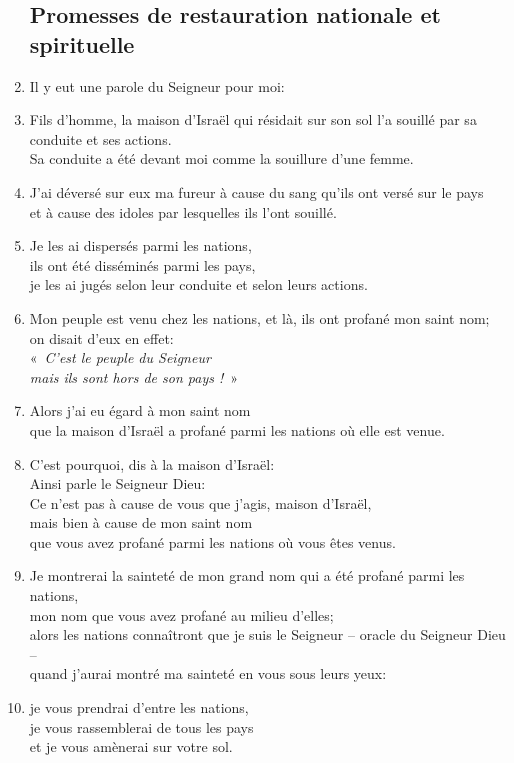 \documentclass[12pt,a4paper,titlepage]{article}
\def \pslabelsep{0.2em} %
\def \psleftmargin{0em} %
\begin{document}
\begin{enumerate}[leftmargin=\psleftmargin, labelsep = \pslabelsep, label={\arabic*}, font=\color{\pscolor}\small\textsuperscript, parsep=0em, itemsep=0em, topsep=0em ]
\subsection*{Promesses de restauration nationale et spirituelle}
\item Il y eut une parole du Seigneur pour moi:
\item Fils d’homme, la maison d’Israël qui résidait sur son sol l’a souillé par sa conduite et ses actions. \\ Sa conduite a été devant moi comme la souillure d’une femme.
\item J’ai déversé sur eux ma fureur à cause du sang qu’ils ont versé sur le pays \\ et à cause des idoles par lesquelles ils l’ont souillé.
\item Je les ai dispersés parmi les nations, \\ ils ont été disséminés parmi les pays, \\ je les ai jugés selon leur conduite et selon leurs actions.
\item Mon peuple est venu chez les nations, et là, ils ont profané mon saint nom; \\ on disait d’eux en effet: \\ \decalage «~\textit{C’est le peuple du Seigneur \\ \decalage mais ils sont hors de son pays !}~»
\item Alors j’ai eu égard à mon saint nom \\ que la maison d’Israël a profané parmi les nations où elle est venue. \parSpace
\item C’est pourquoi, dis à la maison d’Israël: \\ Ainsi parle le Seigneur Dieu: \\ Ce n’est pas à cause de vous que j’agis, maison d’Israël, \\ mais bien à cause de mon saint nom \\ que vous avez profané parmi les nations où vous êtes venus.
\item Je montrerai la sainteté de mon grand nom qui a été profané parmi les nations, \\ mon nom que vous avez profané au milieu d’elles; \\ alors les nations connaîtront que je suis le Seigneur – oracle du Seigneur Dieu – \\ quand j’aurai montré ma sainteté en vous sous leurs yeux:
\item je vous prendrai d’entre les nations, \\ je vous rassemblerai de tous les pays \\ et je vous amènerai sur votre sol.

\end{enumerate}
\end{document}
